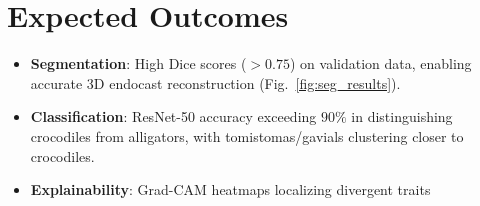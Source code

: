 \section{Expected Outcomes}  
\begin{itemize}  
    \item \textbf{Segmentation}: High Dice scores (\(>0.75\)) on validation data, enabling accurate 3D endocast reconstruction (Fig.~\ref{fig:seg_results}).  
    \item \textbf{Classification}: ResNet-50 accuracy exceeding \(90\%\) in distinguishing crocodiles from alligators, with tomistomas/gavials clustering closer to crocodiles.  
    \item \textbf{Explainability}: Grad-CAM heatmaps localizing divergent traits 
\end{itemize}  
